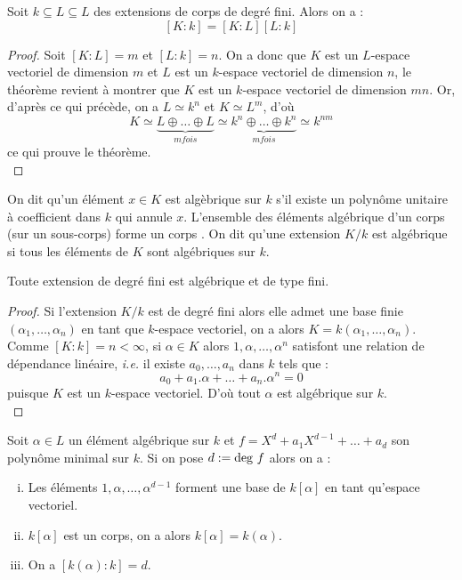 \documentclass[a4paper]{article} %
\numberwithin{section}{part}
\numberwithin{equation}{section}
\begin{document}
\begin{thm}
Soit $k \subseteq L \subseteq L$ des extensions de corps de degré fini. Alors on
a :
\[[K:k] = [K:L][L:k]\]
\end{thm}
\begin{proof}
Soit $[K:L] = m$ et $[L:k] = n$. On a donc que $K$ est un $L$-espace vectoriel 
de dimension $m$ et $L$ est un $k$-espace vectoriel de dimension $n$, le 
théorème revient à montrer que $K$ est un $k$-espace vectoriel de dimension 
$mn$. Or, d'après ce qui précède, on a $L \simeq k^n$ et $K \simeq L^m$, d'où
\[K \simeq \underbrace{L \oplus\dots\oplus L}_{m fois}\simeq\underbrace
{k^n\oplus\dots\oplus k^n}_{m fois} \simeq k^{nm}\]
ce qui prouve le théorème.\\
\end{proof}

On dit qu'un élément $x\in K$ est algèbrique sur $k$ s'il existe un polynôme 
unitaire à coefficient dans $k$ qui annule $x$. L'ensemble des éléments 
algébrique d'un corps (sur un sous-corps) forme un corps \cite[p.~64, théorème
1.14]{Per}. On dit qu'une extension $K/k$ est algébrique si tous les éléments 
de $K$ sont algébriques sur $k$.

\begin{prop}
Toute extension de degré fini est algébrique et de type fini.
\end{prop}
\begin{proof}
Si l'extension $K/k$ est de degré fini alors elle admet une base finie 
$(\alpha_1,\dots,\alpha_n)$ en tant que $k$-espace vectoriel, on a alors $K 
= k(\alpha_1,\dots,\alpha_n)$. Comme $[K:k] = n < \infty$, si $\alpha\in K$ 
alors $1, \alpha, \dots, \alpha^n$ satisfont une relation de dépendance 
linéaire, \textit{i.e.} il existe $a_0, \dots, a_n$ dans $k$ tels que :
\[a_0 + a_1.\alpha + \dots + a_n.\alpha^n = 0\]
puisque $K$ est un $k$-espace vectoriel. D'où tout $\alpha$ est algébrique 
sur $k$.\\
\end{proof}

\begin{prop}
Soit $\alpha\in L$ un élément algébrique sur $k$ et $f = X^d + a_1X^{d-1} + 
\dots + a_d$ son polynôme minimal sur $k$. Si on pose $d := \textup{deg }f$ 
alors on a :
\begin{enumerate}[(i)]
\item Les éléments $1, \alpha,\dots,\alpha^{d-1}$ forment une base de 
$k[\alpha]$ en tant qu'espace vectoriel.
\item $k[\alpha]$ est un corps, on a alors $k[\alpha] = k(\alpha)$.
\item On a $[k(\alpha):k] = d$.
\end{enumerate}
\end{prop}
\end{document}
